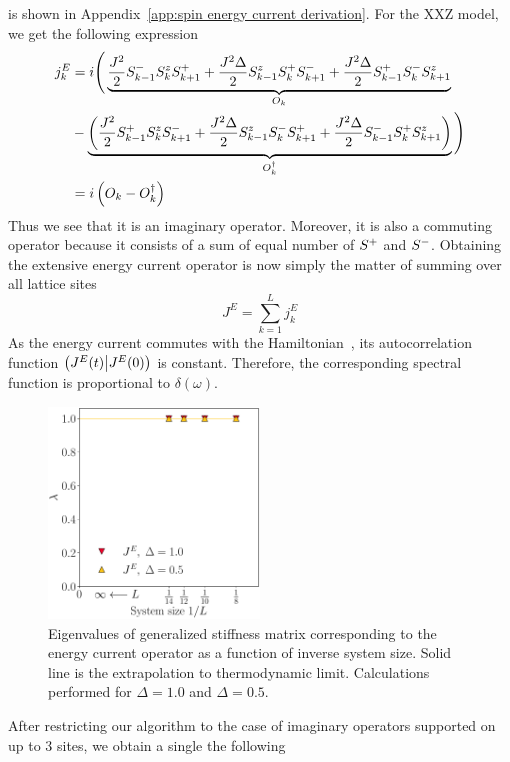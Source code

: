 is shown in Appendix~\ref{app:spin energy current derivation}. For the XXZ model, we get the following expression
\begin{align}
  j_k^E &= i \Bigg( \underbrace{\frac{J^2}{2} S^{-}_{k-1}S^{z}_k S^{+}_{k+1} + \frac{J^2\Delta}{2} S^{z}_{k-1}S^{+}_k S^{-}_{k+1} + \frac{J^2\Delta}{2} S^{+}_{k-1}S^{-}_kS^{z}_{k+1}}_{O_k} \nonumber \\
  &- \underbrace{\left(\frac{J^2}{2} S^{+}_{k-1}S^{z}_k S^{-}_{k+1} + \frac{J^2\Delta}{2} S^{z}_{k-1}S^{-}_k S^{+}_{k+1} + \frac{J^2\Delta}{2} S^{-}_{k-1}S^{+}_{k} S^{z}_{k+1} \right)}_{O_k^{\dagger}}\Bigg) \nonumber \\
  &= i\left(O_k - O_k^{\dagger}\right) \label{eq:ec}
\end{align}
Thus we see that it is an imaginary operator. Moreover, it is also a commuting operator
because it consists of a sum of equal number of \(S^{+}{}\) and \(S^{-}{}\). 
Obtaining the extensive energy current operator is now simply the matter of summing over all lattice sites
\begin{equation}
  J^E = \sum_{k=1}^L j_k^E
  \label{eq:energy current}
\end{equation}
As the energy current commutes with the Hamiltonian~\autocite{Zotos1997}, its autocorrelation
function \(\left(J^E(t) \middle| J^E(0)\right)\) is constant. Therefore, the corresponding
spectral function is proportional to \(\delta(\omega)\).
\begin{figure}[htbp]
  \centering
  \includegraphics[width=0.5\textwidth]{Figures/current_int.pdf}
  \caption{Eigenvalues of generalized stiffness matrix corresponding to the energy current
  operator as a function of inverse system size. Solid line is the extrapolation to thermodynamic
  limit. Calculations performed for \(\Delta=1.0\) and \(\Delta=0.5\).}\label{fig: current integrable}
\end{figure}
After restricting our algorithm to the case of imaginary
operators supported on up to \(3\) sites, we obtain a single the following
